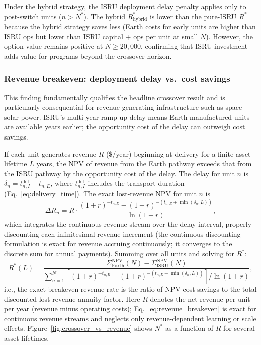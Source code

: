 \documentclass[preprint,12pt]{elsarticle}
\begin{document}
Under the hybrid strategy, the ISRU deployment delay penalty applies only to post-switch units ($n > N^*$). The hybrid $R^*_{\mathrm{hybrid}}$ is lower than the pure-ISRU $R^*$ because the hybrid strategy saves less (Earth costs for early units are higher than ISRU ops but lower than ISRU capital + ops per unit at small $N$). However, the option value remains positive at $N \geq 20{,}000$, confirming that ISRU investment adds value for programs beyond the crossover horizon.

\subsubsection{Revenue breakeven: deployment delay vs.\ cost savings}

This finding fundamentally qualifies the headline crossover result and is particularly consequential for revenue-generating infrastructure such as space solar power. ISRU's multi-year ramp-up delay means Earth-manufactured units are available years earlier; the opportunity cost of the delay can outweigh cost savings.

If each unit generates revenue $R$ (\$/year) beginning at delivery for a finite asset lifetime $L$ years, the NPV of revenue from the Earth pathway exceeds that from the ISRU pathway by the opportunity cost of the delay. The delay for unit $n$ is $\delta_n = t_{n,I}^{\mathrm{del}} - t_{n,E}$, where $t_{n,I}^{\mathrm{del}}$ includes the transport duration (Eq.~\ref{eq:delivery_time}). The exact lost-revenue NPV for unit $n$ is
\begin{equation}
  \Delta R_n = R \cdot \frac{(1+r)^{-t_{n,E}} - (1+r)^{-(t_{n,E}+\min(\delta_n,L))}}{\ln(1+r)},
  \label{eq:exact_lost_revenue}
\end{equation}
which integrates the continuous revenue stream over the delay interval, properly discounting each infinitesimal revenue increment (the continuous-discounting formulation is exact for revenue accruing continuously; it converges to the discrete sum for annual payments). Summing over all units and solving for $R^*$:
\begin{equation}
  R^*(L) = \frac{\Sigma_{\mathrm{Earth}}^{\mathrm{NPV}}(N) - \Sigma_{\mathrm{ISRU}}^{\mathrm{NPV}}(N)}{\sum_{n=1}^{N} \left[(1+r)^{-t_{n,E}} - (1+r)^{-(t_{n,E}+\min(\delta_n,L))}\right] / \ln(1+r)},
  \label{eq:revenue_breakeven}
\end{equation}
i.e., the exact breakeven revenue rate is the ratio of NPV cost savings to the total discounted lost-revenue annuity factor. Here $R$ denotes the net revenue per unit per year (revenue minus operating costs); Eq.~\ref{eq:revenue_breakeven} is exact for continuous revenue streams and neglects only revenue-dependent learning or scale effects. Figure~\ref{fig:crossover_vs_revenue} shows $N^*$ as a function of $R$ for several asset lifetimes.
\end{document}
